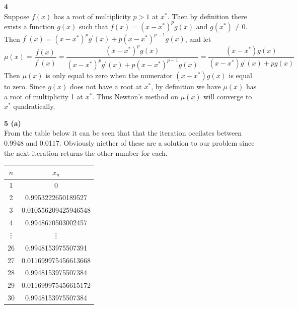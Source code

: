 \documentclass[12pt]{article}
\newcommand{\problem}[1]{\hspace{-4 ex} \large \textbf{#1}\\}
\begin{document}
\problem{4}
	Suppose $f(x)$ has a root of multiplicity $p>1$ at $x^*$. Then by definition there exists a function $g(x)$ such that $f(x) = (x-x^*)^pg(x)$ and $g(x^*) \neq 0$. Then $f^\prime(x) = (x-x^*)^pg^\prime(x) + p(x-x^*)^{p-1}g(x)$, and let 
	$$
	\mu(x) = \frac{f(x)}{f^\prime(x)} = \frac{(x-x^*)^pg(x)}{(x-x^*)^pg^\prime(x) + p(x-x^*)^{p-1}g(x)} = \frac{(x-x^*)g(x)}{(x-x^*)g^\prime(x) + pg(x)}
	$$
	Then $\mu(x)$ is only equal to zero when the numerator $(x-x^*)g(x)$ is equal to zero. Since $g(x)$ does not have a root at $x^*$, by definition we have $\mu(x)$ has a root of multiplicity 1 at $x^*$. Thus Newton's method on $\mu(x)$ will converge to $x^*$ quadratically. 

\problem{5 (a)}
	From the table below it can be seen that that the iteration occilates between 0.9948 and 0.0117. Obviously niether of these are a solution to our problem since the next iteration returns the other number for each.
	\singlespacing
	\begin{center}
		\begin{tabular}{|c|c|}
			\hline
			$n$&$x_n$\\ \hline
			1&0\\ \hline
			2&0.9953222650189527\\ \hline
			3&0.010556209425946548\\ \hline
			4&0.9948670503002457\\ \hline
			\vdots & \vdots \\ \hline
			26&0.9948153975507391\\ \hline
			27&0.011699975456613668\\ \hline
			28&0.9948153975507384\\ \hline
			29&0.011699975456615172\\ \hline
			30&0.9948153975507384\\ \hline
		\end{tabular}
	\end{center}
	\doublespacing
	
\end{document}
